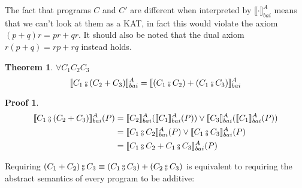 \documentclass{article}
\newtheorem{theorem}{Theorem}
\newtheorem{proofs}{Proof}
\newcommand*{\sem}[1]{
    \llbracket #1 \rrbracket
}
\newcommand{\bca}[2]{
    #2_{bai}^{#1}
}
\newcommand{\bsem}[2][A]{
    \bca{#1}{\sem{#2}}
}
\def\fcmp{\mathbin{\raise 0.6ex\hbox{\oalign{\hfil$\scriptscriptstyle      
    \mathrm{o}$\hfil\cr\hfil$\scriptscriptstyle\mathrm{9}$\hfil}}}}
\begin{document}
    The fact that programs $C$ and $C'$ are different when interpreted by
    $\bsem{\cdot}$ means that we can't look at them as a KAT, in fact
    this would violate the axiom $(p + q)r = pr + qr$. It should also
    be noted that the dual axiom $r(p + q) = rp + rq$ instead holds.

    \begin{theorem}
        $\forall C_1 C_2 C_3$
        $$\bsem{C_1 \fcmp (C_2 + C_3)} = \bsem{(C_1 \fcmp C_2) + (C_1 \fcmp C_3)}$$
    \end{theorem}
    \begin{proofs}
        \begin{align*}
            \bsem{C_1 \fcmp (C_2 + C_3)}(P)
                &= \bsem{C_2}(\bsem{C_1}(P)) \lor \bsem{C_3}(\bsem{C_1}(P)) \\
                &= \bsem{C_1 \fcmp C_2}(P) \lor \bsem{C_1 \fcmp C_3}(P) \\
                &= \bsem{C_1 \fcmp C_2 + C_1 \fcmp C_3}(P) 
        \end{align*}
    \end{proofs}

    Requiring $(C_1 + C_2) \fcmp C_3 \equiv (C_1 \fcmp C_3) 
    + (C_2 \fcmp C_3)$ is equivalent to requiring the abstract semantics
    of every program to be additive:
\end{document}
